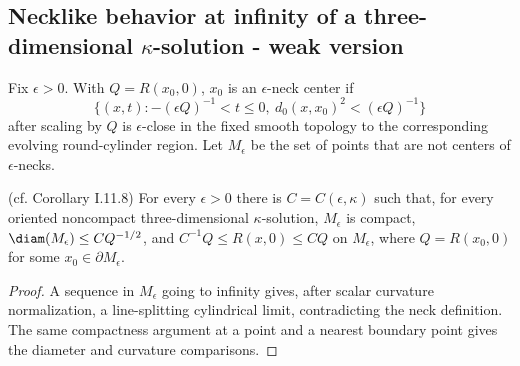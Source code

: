 \subsection{Necklike behavior at infinity of a three-dimensional $\kappa$-solution - weak version}
\begin{definition}
\label{def:kl-necklike-behavior-at-infinity-three-dimensional-solution-weak-version-kappa-solution-definition}


Fix $\epsilon>0$.  With $Q=R(x_0,0)$, $x_0$ is an $\epsilon$-neck center if
\[
\{(x,t):-(\epsilon Q)^{-1}<t\leq0,\ d_0(x,x_0)^2<(\epsilon Q)^{-1}\}
\]
after scaling by $Q$ is $\epsilon$-close in the fixed smooth topology to
the corresponding evolving round-cylinder region.  Let $M_\epsilon$ be the
set of points that are not centers of $\epsilon$-necks.
\end{definition}
\begin{corollary}
\label{cor:kl-necklike-behavior-at-infinity-three-dimensional-solution-weak-version-existence-kappa-solutions}

(cf. Corollary I.11.8) \label{corI.11.8}
For every $\epsilon>0$ there is $C=C(\epsilon,\kappa)$ such that, for every
oriented noncompact three-dimensional $\kappa$-solution, $M_\epsilon$ is
compact, $\diam(M_\epsilon)\leq CQ^{-1/2}$, and
$C^{-1}Q\leq R(x,0)\leq CQ$ on $M_\epsilon$, where
$Q=R(x_0,0)$ for some $x_0\in\partial M_\epsilon$.
\end{corollary}
\begin{proof}
\sketch A sequence in $M_\epsilon$ going to infinity gives, after scalar
curvature normalization, a line-splitting cylindrical limit, contradicting
the neck definition.  The same compactness argument at a point and a nearest
boundary point gives the diameter and curvature comparisons.
\end{proof}

